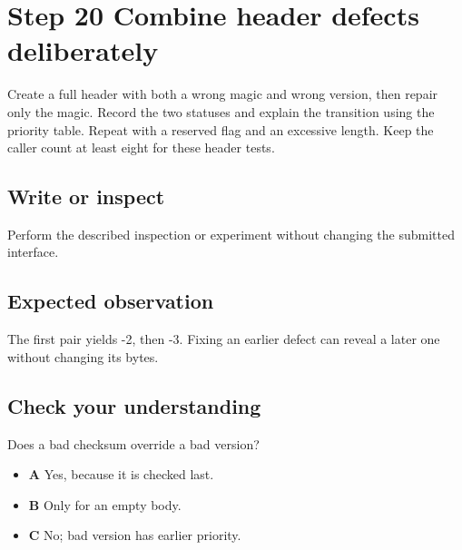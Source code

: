 \section{Step 20 Combine header defects deliberately}\label{packet-s20}

Create a full header with both a wrong magic and wrong version, then repair only the magic. Record the two statuses and explain the transition using the priority table. Repeat with a reserved flag and an excessive length. Keep the caller count at least eight for these header tests.

\subsection{Write or inspect}
Perform the described inspection or experiment without changing the submitted interface.

\subsection{Expected observation}
The first pair yields -2, then -3. Fixing an earlier defect can reveal a later one without changing its bytes.

\subsection{Check your understanding}
Does a bad checksum override a bad version?

\begin{itemize}
  \item \textbf{A} Yes, because it is checked last.
  \item \textbf{B} Only for an empty body.
  \item \textbf{C} No; bad version has earlier priority.
\end{itemize}
